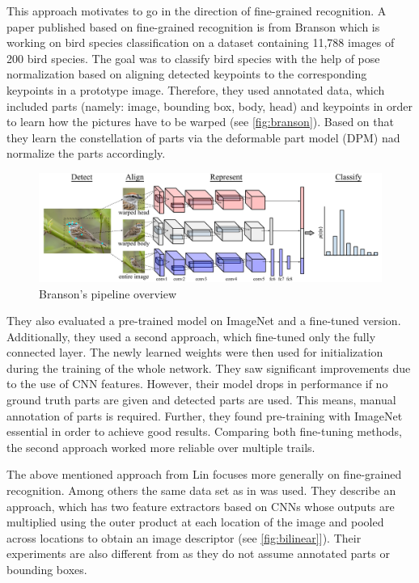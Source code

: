 \documentclass[electronic]{vgtc}             %
\begin{document}
	This approach motivates to go in the direction of fine-grained recognition.	
	A paper published based on fine-grained recognition is from Branson \cite{Branson:2014} which is working on bird species classification on a dataset containing 11,788 images of 200 bird species.
	The goal was to classify bird species with the help of pose normalization based on aligning detected keypoints to the corresponding keypoints in a prototype image.
	Therefore, they used annotated data, which included parts (namely: image, bounding box, body, head) and keypoints in order to learn how the pictures have to be warped (see \autoref{fig:branson}).
	Based on that they learn the constellation of parts via the deformable part model (DPM) nad normalize the parts accordingly.
	
	\begin{figure}[htbp]
		\includegraphics[width=.48\textwidth]{branson-pipeline}
		\caption{Branson's pipeline overview \cite{Branson:2014}}
		\label{fig:branson}
	\end{figure}
	
	They also evaluated a pre-trained model on ImageNet and a fine-tuned version.
	Additionally, they used a second approach, which fine-tuned only the fully connected layer.
	The newly learned weights were then used for initialization during the training of the whole network. 
	They saw significant improvements due to the use of CNN features. 
	However, their model drops in performance if no ground truth parts are given and detected parts are used.
	This means, manual annotation of parts is required.
	Further, they found pre-training with ImageNet essential in order to achieve good results.
	Comparing both fine-tuning methods, the second approach worked more reliable over multiple trails.
	
	The above mentioned approach from Lin \cite{Lin:2015} focuses more generally on fine-grained recognition. 
	Among others the same data set as in \cite{Branson:2014} was used.
	They describe an approach, which has two feature extractors based on CNNs whose outputs are multiplied using the outer product at each location of the image and pooled	across locations to obtain an image descriptor (see \autoref{fig:bilinear}]).
	Their experiments are also different from \cite{Branson:2014} as they do not assume annotated parts or bounding boxes.
	
\end{document}
